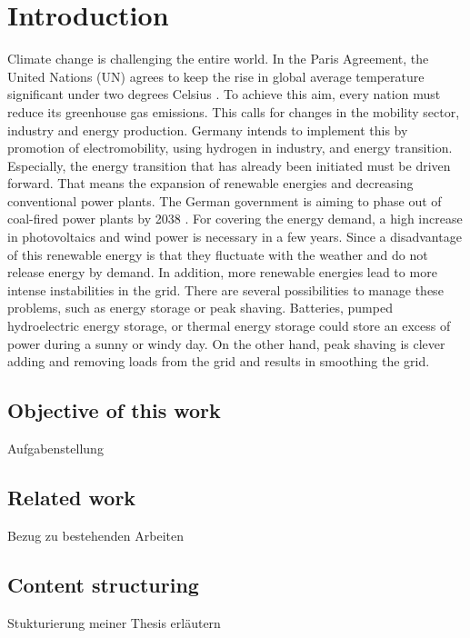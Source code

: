 \chapter{Introduction}
\label{ch:introduction}
Climate change is challenging the entire world. In the Paris Agreement, the United Nations (UN) agrees to keep the rise in global average temperature significant under two degrees Celsius \cite{UnitedNations.2015}. To achieve this aim, every nation must reduce its greenhouse gas emissions. This calls for changes in the mobility sector, industry and energy production. Germany intends to implement this by promotion of electromobility, using hydrogen in industry, and energy transition. Especially, the energy transition that has already been initiated must be driven forward. That means the expansion of renewable energies and decreasing conventional power plants. The German government is aiming to phase out of coal-fired power plants by 2038 \cite{bundesregierung.2021}. For covering the energy demand, a high increase in photovoltaics and wind power is necessary in a few years. Since a disadvantage of this renewable energy is that they fluctuate with the weather and do not release energy by demand. In addition, more renewable energies lead to more intense instabilities in the grid. There are several possibilities to manage these problems, such as energy storage or peak shaving. Batteries, pumped hydroelectric energy storage, or thermal energy storage could store an excess of power during a sunny or windy day. On the other hand, peak shaving is clever adding and removing loads from the grid and results in smoothing the grid.

\section{Objective of this work}
\label{section:obejective}
Aufgabenstellung
\section{Related work}
\label{section:relatedwork}
Bezug zu bestehenden Arbeiten
\section{Content structuring}
\label{section:contentstructuring}
Stukturierung meiner Thesis erläutern

